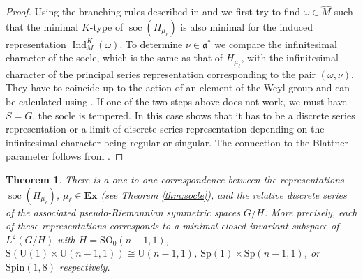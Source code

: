 \documentclass[JEP,XML,SOM,NoFloatCountersInSection,Unicode,published]{cedram}
\newtheorem{theorem}{Theorem}[section]
\theoremstyle{definition}
\newcommand{\mf}[1]{\ensuremath{\mathfrak{#1}}}
\newcommand{\on}[1]{\ensuremath{\operatorname{#1}}}
\newcommand{\pst}[1]{\ensuremath{H_{#1}}}
\newcommand{\GSO}[1]{\ensuremath{\mathrm{SO}_0(#1,1)}}
\begin{document}
\begin{proof}
Using the branching rules described in \cite{B79} and \cite[Th.\,9.16]{knapplie} we first try to find $\omega\in\hat M$ such that the minimal $K$-type of $\on{soc}(\pst{\mu_\ell})$ is also minimal for the induced representation $\on{Ind}_M^K(\omega)$. To determine $\nu\in\mf a^*$ we compare the infinitesimal character of the socle, which is the same as that of $\pst{\mu_\ell}$, with the infinitesimal character of the principal series representation corresponding to the pair $(\omega,\nu)$. They have to coincide up to the action of an element of the Weyl group and can be calculated using \cite[Prop.\,8.22]{Kna86}. If one of the two steps above does not work, we must have $S=G$, \ie the socle is tempered. In this case \cite[Th.\,14.2]{KZ82} shows that it has to be a discrete series representation or a limit of discrete series representation depending on the infinitesimal character being regular or singular. The connection to the Blattner parameter follows from \cite[Ch.\,XV, \S 1, Ex.\,(1)]{Kna86}.
\end{proof}

\begin{theorem}\label{thm:nonRiem}
There is a one-to-one correspondence between the representations $\on{soc}(\pst{\mu_\ell})$, $\mu_\ell\in\mathbf{Ex}$ (see Theorem \ref{thm:socle}), and the relative discrete series of the associated pseudo-Riemannian symmetric spaces $G/H$. More precisely, each of these representations corresponds to a minimal closed invariant subspace of $L^2(G/H)$ with $H=\GSO{n-1}$, ${\mathrm{S}(\mathrm{U}(1)\times\mathrm{U}(n-1,1))\cong\mathrm{U}(n-1,1)}$, ${\mathrm{Sp}(1)\times\mathrm{Sp}(n-1,1)}$, or $\mathrm{Spin}(1,8)$ respectively.
\end{theorem}
\end{document}
